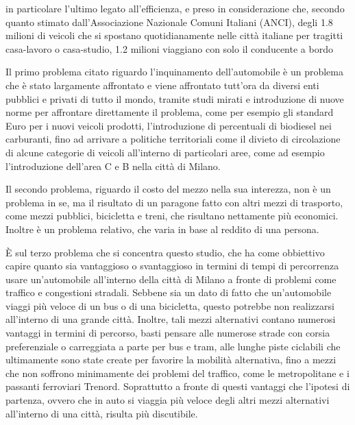 






in particolare l'ultimo legato all'efficienza, e preso in considerazione che, secondo quanto stimato dall'Associazione Nazionale Comuni Italiani (ANCI), degli 1.8 milioni di veicoli che si spostano quotidianamente nelle città italiane per tragitti casa-lavoro o casa-studio, 1.2 milioni viaggiano con solo il conducente a bordo\cite{anciperrepubblica}







Il primo problema citato riguardo l'inquinamento dell'automobile è un problema che è stato largamente affrontato e viene affrontato tutt'ora da diversi enti pubblici e privati di tutto il mondo, tramite studi mirati e introduzione di nuove norme per affrontare direttamente il problema, come per esempio gli standard Euro per i nuovi veicoli prodotti, l'introduzione di percentuali di biodiesel nei carburanti, fino ad arrivare a politiche territoriali come il divieto di circolazione di alcune categorie di veicoli all'interno di particolari aree, come ad esempio l'introduzione dell'area C e B nella città di Milano.

Il secondo problema, riguardo il costo del mezzo nella sua interezza, non è un problema in se, ma il risultato di un paragone fatto con altri mezzi di trasporto, come mezzi pubblici, bicicletta e treni, che risultano nettamente più economici. Inoltre è un problema relativo, che varia in base al reddito di una persona.

È sul terzo problema che si concentra questo studio, che ha come obbiettivo capire quanto sia vantaggioso o svantaggioso in termini di tempi di percorrenza usare un'automobile all'interno della città di Milano a fronte di problemi come traffico e congestioni stradali.
Sebbene sia un dato di fatto che un'automobile viaggi più veloce di un bus o di una bicicletta, questo potrebbe non realizzarsi all'interno di una grande città. Inoltre, tali mezzi alternativi contano numerosi vantaggi in termini di percorso, basti pensare alle numerose strade con corsia preferenziale o carreggiata a parte per bus e tram, alle lunghe piste ciclabili che ultimamente sono state create per favorire la mobilità alternativa, fino a mezzi che non soffrono minimamente dei problemi del traffico, come le metropolitane e i passanti ferroviari Trenord. Soprattutto a fronte di questi vantaggi che l'ipotesi di partenza, ovvero che in auto si viaggia più veloce degli altri mezzi alternativi all'interno di una città, risulta più discutibile.


